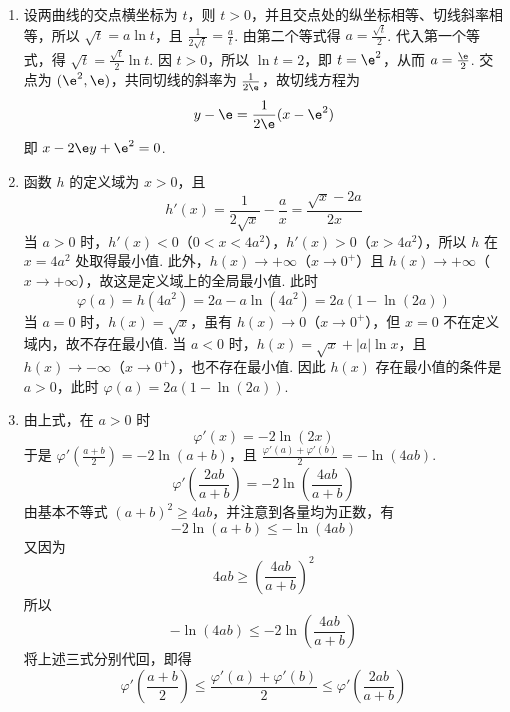 \begin{solution}
\begin{enumerate}
\item 设两曲线的交点横坐标为 \(t\)，则 \(t>0\)，并且交点处的纵坐标相等、切线斜率相等，所以 \(\sqrt{t}=a\ln t\)，且 \(\frac{1}{2\sqrt{t}}=\frac{a}{t}\).
由第二个等式得 \(a=\frac{\sqrt{t}}{2}\). 代入第一个等式，得 \(\sqrt{t}=\frac{\sqrt{t}}{2}\ln t\). 因 \(t>0\)，所以 \(\ln t=2\)，即 \(t=\e^2\)，从而 \(a=\frac{\e}{2}\).
交点为 \((\e^2,\e)\)，共同切线的斜率为 \(\frac{1}{2\e}\)，故切线方程为
\[
y-\e=\frac{1}{2\e}(x-\e^2)
\]
即 \(x-2\e y+\e^2=0\).
\item 函数 \(h\) 的定义域为 \(x>0\)，且
\[
h'(x)=\frac{1}{2\sqrt{x}}-\frac{a}{x}=\frac{\sqrt{x}-2a}{2x}
\]
当 \(a>0\) 时，\(h'(x)<0\)（\(0<x<4a^2\)），\(h'(x)>0\)（\(x>4a^2\)），所以 \(h\) 在 \(x=4a^2\) 处取得最小值. 此外，\(h(x)\to+\infty\)（\(x\to0^+\)）且 \(h(x)\to+\infty\)（\(x\to+\infty\)），故这是定义域上的全局最小值. 此时
\[
\varphi(a)=h(4a^2)=2a-a\ln(4a^2)=2a\left(1-\ln(2a)\right)
\]
当 \(a=0\) 时，\(h(x)=\sqrt{x}\)，虽有 \(h(x)\to0\)（\(x\to0^+\)），但 \(x=0\) 不在定义域内，故不存在最小值. 当 \(a<0\) 时，\(h(x)=\sqrt{x}+|a|\ln x\)，且 \(h(x)\to-\infty\)（\(x\to0^+\)），也不存在最小值. 因此 \(h(x)\) 存在最小值的条件是 \(a>0\)，此时 \(\varphi(a)=2a\left(1-\ln(2a)\right)\).
\item 由上式，在 \(a>0\) 时
\[
\varphi'(x)=-2\ln(2x)
\]
于是 \(\varphi'\left(\frac{a+b}{2}\right)=-2\ln(a+b)\)，且 \(\frac{\varphi'(a)+\varphi'(b)}{2}=-\ln(4ab)\).
\[
\varphi'\left(\frac{2ab}{a+b}\right)=-2\ln\left(\frac{4ab}{a+b}\right)
\]
由基本不等式 \((a+b)^2\geqslant4ab\)，并注意到各量均为正数，有
\[
-2\ln(a+b)\leqslant-\ln(4ab)
\]
又因为
\[
4ab\geqslant\left(\frac{4ab}{a+b}\right)^2
\]
所以
\[
-\ln(4ab)\leqslant-2\ln\left(\frac{4ab}{a+b}\right)
\]
将上述三式分别代回，即得
\[
\varphi'\left(\frac{a+b}{2}\right)\leqslant\frac{\varphi'(a)+\varphi'(b)}{2}\leqslant\varphi'\left(\frac{2ab}{a+b}\right)
\]
\end{enumerate}
\end{solution}
